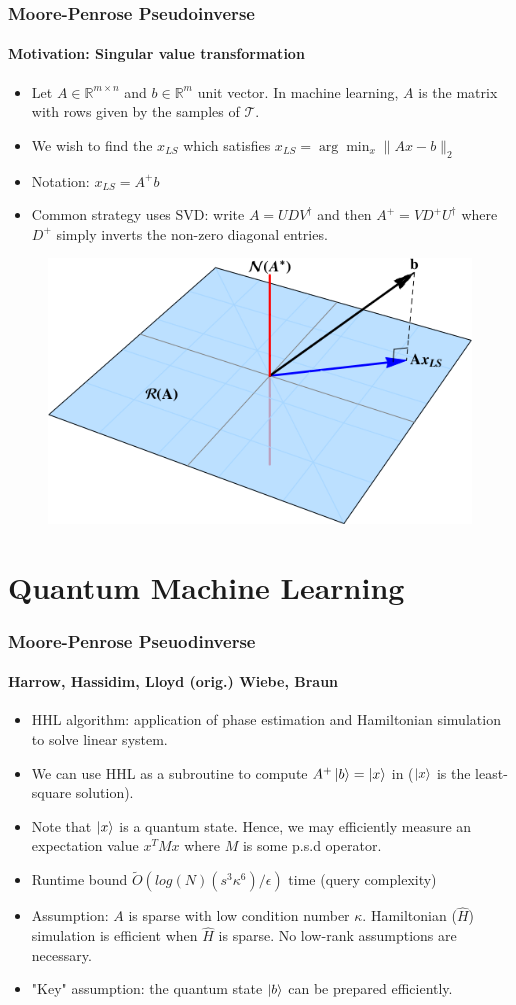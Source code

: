 \documentclass{beamer}
\newcommand\0{\mathbf{0}}
\newcommand\RR{\mathbb{R}}
\newcommand\<{\langle}
\renewcommand\>{\rangle}
\begin{document}
\begin{frame}
\frametitle{Moore-Penrose Pseudoinverse}
    \framesubtitle{Motivation: Singular value transformation}
    \begin{itemize}
    \item Let $A \in \RR^{m \times n}$ and $b \in \RR^m$ unit vector. In machine learning, $A$ is the matrix with rows given by the samples of $\mathcal{T}$. 
    \item We wish to find the $x_{LS}$ which satisfies $x_{LS} = \arg\min_{x} \| Ax - b \|_2$
    \item Notation: $x_{LS} = A^+ b$
    \item Common strategy uses SVD: write $A = UDV^\dag$ and then $A^+ = VD^+U^\dag$ where $D^+$ simply inverts the non-zero diagonal entries.
    \end{itemize}
	\begin{figure}
   \includegraphics[width= 0.5\linewidth]{least-squares.png}	
\end{figure}
\end{frame}

\section{Quantum Machine Learning}

\begin{frame}
\frametitle{Moore-Penrose Pseuodinverse}
\framesubtitle{Harrow, Hassidim, Lloyd (orig.) Wiebe, Braun} 
\begin{itemize}
    \item HHL algorithm: application of phase estimation and Hamiltonian simulation to solve linear system.
    \item We can use HHL as a subroutine to compute $A^+ \ket{b} = \ket{x}$ in ($\ket{x}$ is the least-square solution).
    \item Note that $\ket{x}$ is a quantum state. Hence, we may efficiently measure an expectation value $x^T M x$ where $M$ is some p.s.d operator.
    \item Runtime bound $\tilde{O}(log(N)(s^3\kappa^6)/ \epsilon)$ time (query complexity)
    \item Assumption: $A$ is sparse with low condition number $\kappa$. Hamiltonian ($\hat{H}$) simulation is efficient when $\hat{H}$ is sparse. No low-rank assumptions are necessary.
    \item "Key" assumption: the quantum state $\ket{b}$ can be prepared efficiently.	
    

\end{itemize}
\end{frame}
\end{document}
